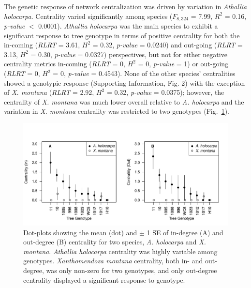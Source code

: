 \documentclass[fleqn,12pt]{olplainarticle}
\begin{document}


The genetic response of network centralization was driven by variation
in \textit{Athallia holocarpa}. Centrality varied significantly among
species ($F_{8, 324}$ = 7.99, $R^2$ = 0.16, \textit{p-value} $<$
0.0001). \textit{Athallia holocarpa} was the main species
to exhibit a significant response to tree genotype in terms of
positive centrality for both the in-coming (\textit{RLRT} = 3.61,
$H^2$ = 0.32, \textit{p-value} = 0.0240) and out-going (\textit{RLRT}
= 3.13, $H^2$ = 0.30, \textit{p-value} = 0.0327) perspectives, but not
for either negative centrality metrics in-coming (\textit{RLRT} = 0,
$H^2$ = 0, \textit{p-value} = 1) or out-going (\textit{RLRT} = 0,
$H^2$ = 0, \textit{p-value} = 0.4543). None of the other species'
centralities showed a genotypic response (Supporting Information,
Fig. 2) with the exception of \textit{X. montana} (\textit{RLRT} =
2.92, $H^2$ = 0.32, \textit{p-value} = 0.0375); however, the
centrality of \textit{X. montana} was much lower overall relative to
\textit{A. holocarpa} and the variation in \textit{X. montana}
centrality was restricted to two genotypes
(Fig.~\ref{fig:geno_sppcen}).



\begin{figure}[ht]
\centering
\includegraphics[width=\linewidth]{figures/geno_sppcen.pdf}
\caption{Dot-plots showing the mean (dot) and $\pm$ 1 SE of in-degree
  (A) and out-degree (B) centrality for two species,
  \textit{A. holocarpa} and \textit{X. montana}. \textit{Athallia
    holocarpa} centrality was highly variable among
  genotypes. \textit{Xanthomendoza montana} centrality, both in- and
  out-degree, was only non-zero for two genotypes, and only out-degree
  centrality displayed a significant response to genotype.}
\label{fig:geno_sppcen}
\end{figure}
\end{document}
